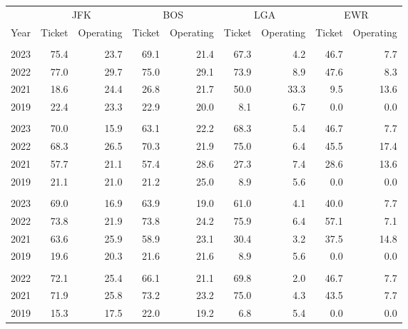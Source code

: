 
\begin{tabular}[t]{rrrrrrrrr}
\toprule
\multicolumn{1}{c}{ } & \multicolumn{2}{c}{JFK} & \multicolumn{2}{c}{BOS} & \multicolumn{2}{c}{LGA} & \multicolumn{2}{c}{EWR} \\
\cmidrule(l{3pt}r{3pt}){2-3} \cmidrule(l{3pt}r{3pt}){4-5} \cmidrule(l{3pt}r{3pt}){6-7} \cmidrule(l{3pt}r{3pt}){8-9}
Year & Ticket & Operating & Ticket & Operating & Ticket & Operating & Ticket & Operating\\
\midrule
\addlinespace[0.3em]
\multicolumn{9}{l}{\textbf{Q1}}\\
\hspace{1em}2023 & 75.4 & 23.7 & 69.1 & 21.4 & 67.3 & 4.2 & 46.7 & 7.7\\
\hspace{1em}2022 & 77.0 & 29.7 & 75.0 & 29.1 & 73.9 & 8.9 & 47.6 & 8.3\\
\hspace{1em}2021 & 18.6 & 24.4 & 26.8 & 21.7 & 50.0 & 33.3 & 9.5 & 13.6\\
\hspace{1em}2019 & 22.4 & 23.3 & 22.9 & 20.0 & 8.1 & 6.7 & 0.0 & 0.0\\
\addlinespace[0.3em]
\multicolumn{9}{l}{\textbf{Q2}}\\
\hspace{1em}2023 & 70.0 & 15.9 & 63.1 & 22.2 & 68.3 & 5.4 & 46.7 & 7.7\\
\hspace{1em}2022 & 68.3 & 26.5 & 70.3 & 21.9 & 75.0 & 6.4 & 45.5 & 17.4\\
\hspace{1em}2021 & 57.7 & 21.1 & 57.4 & 28.6 & 27.3 & 7.4 & 28.6 & 13.6\\
\hspace{1em}2019 & 21.1 & 21.0 & 21.2 & 25.0 & 8.9 & 5.6 & 0.0 & 0.0\\
\addlinespace[0.3em]
\multicolumn{9}{l}{\textbf{Q3}}\\
\hspace{1em}2023 & 69.0 & 16.9 & 63.9 & 19.0 & 61.0 & 4.1 & 40.0 & 7.7\\
\hspace{1em}2022 & 73.8 & 21.9 & 73.8 & 24.2 & 75.9 & 6.4 & 57.1 & 7.1\\
\hspace{1em}2021 & 63.6 & 25.9 & 58.9 & 23.1 & 30.4 & 3.2 & 37.5 & 14.8\\
\hspace{1em}2019 & 19.6 & 20.3 & 21.6 & 21.6 & 8.9 & 5.6 & 0.0 & 0.0\\
\addlinespace[0.3em]
\multicolumn{9}{l}{\textbf{Q4}}\\
\hspace{1em}2022 & 72.1 & 25.4 & 66.1 & 21.1 & 69.8 & 2.0 & 46.7 & 7.7\\
\hspace{1em}2021 & 71.9 & 25.8 & 73.2 & 23.2 & 75.0 & 4.3 & 43.5 & 7.7\\
\hspace{1em}2019 & 15.3 & 17.5 & 22.0 & 19.2 & 6.8 & 5.4 & 0.0 & 0.0\\
\bottomrule
\end{tabular}
